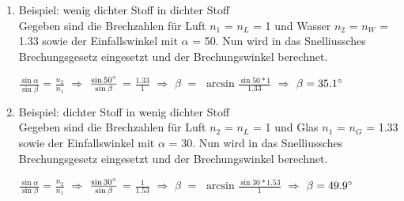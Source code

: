 \begin{enumerate}
\item Beispiel: wenig dichter Stoff in dichter Stoff\\
Gegeben sind die Brechzahlen für Luft $n_1$ = $n_L$ = 1 und Wasser $n_2$ = $n_W$ = 1.33 sowie der Einfallswinkel mit $\alpha$ = 50\degree.
Nun wird in das Snelliussches Brechungsgesetz eingesetzt und der Brechungswinkel berechnet.
\begin{center}
$\frac{\sin\alpha}{\sin\beta}$ = $\frac{n_2}{n_1}$ $\Rightarrow$ $\frac{\sin 50\degree}{\sin\beta}$ = $\frac{1.33}{1}$ $\Rightarrow$ $\beta$ $=$  $\arcsin\frac{\sin 50 * 1}{1.33}$ $\Rightarrow$ $\beta = 35.1\degree$
\end{center}

\item Beispiel: dichter Stoff in wenig dichter Stoff\\
Gegeben sind die Brechzahlen für Luft $n_2$ = $n_L$ = 1 und Glas $n_1$ = $n_G$ = 1.33 sowie der Einfallswinkel mit $\alpha$ = 30\degree.
Nun wird in das Snelliussches Brechungsgesetz eingesetzt und der Brechungswinkel berechnet.
\begin{center}
$\frac{\sin\alpha}{\sin\beta}$ = $\frac{n_2}{n_1}$ $\Rightarrow$ $\frac{\sin 30\degree}{\sin\beta}$ = $\frac{1}{1.53}$ $\Rightarrow$ $\beta$ $=$  $\arcsin\frac{\sin 30 * 1.53}{1}$ $\Rightarrow$ $\beta = 49.9\degree$
\end{center}
\end{enumerate}


\newpage